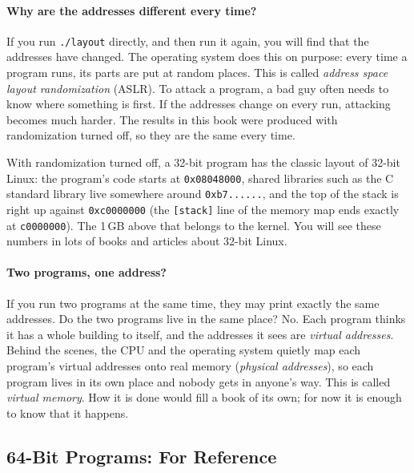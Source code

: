 \paragraph{Why are the addresses different every time?}
If you run \texttt{./layout} directly, and then run it again, you will find that the addresses have changed. The operating system does this on purpose: every time a program runs, its parts are put at random places. This is called \emph{address space layout randomization} (ASLR). To attack a program, a bad guy often needs to know where something is first. If the addresses change on every run, attacking becomes much harder. The results in this book were produced with randomization turned off, so they are the same every time.

With randomization turned off, a 32-bit program has the classic layout of 32-bit Linux: the program's code starts at \texttt{0x08048000}, shared libraries such as the C standard library live somewhere around \texttt{0xb7......}, and the top of the stack is right up against \texttt{0xc0000000} (the \texttt{[stack]} line of the memory map ends exactly at \texttt{c0000000}). The 1\,GB above that belongs to the kernel. You will see these numbers in lots of books and articles about 32-bit Linux.

\paragraph{Two programs, one address?}
If you run two programs at the same time, they may print exactly the same addresses. Do the two programs live in the same place? No. Each program thinks it has a whole building to itself, and the addresses it sees are \emph{virtual addresses}. Behind the scenes, the CPU and the operating system quietly map each program's virtual addresses onto real memory (\emph{physical addresses}), so each program lives in its own place and nobody gets in anyone's way. This is called \emph{virtual memory}. How it is done would fill a book of its own; for now it is enough to know that it happens.

\subsection{64-Bit Programs: For Reference}
\label{sec:layout64}

